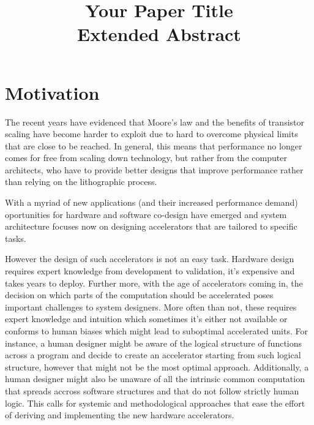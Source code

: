 \documentclass[pageno]{jpaper}
\begin{document}
\title{Your Paper Title \\ \textbf{Extended Abstract}}

\date{}

\maketitle

\thispagestyle{empty}



\section{Motivation}
\label{sec:motivation}

The recent years have evidenced that Moore's law and the benefits of transistor 
scaling have become harder to exploit due to hard to overcome physical limits
that are close to be reached. In general, this means that performance no longer comes
for free from scaling down technology, but rather from the computer
architects, who have to provide better designs that improve performance rather than 
relying on the lithographic process. 

With a myriad of new applications (and their increased performance demand) oportunities for hardware and software co-design have emerged and system architecture focuses now
on designing accelerators that are tailored to specific tasks.

However the design of such accelerators is not an easy task. Hardware design 
requires expert knowledge from development to validation, it's expensive and 
takes years to deploy. Further more, with the age of accelerators coming in,
the decision on which parts of the computation should be accelerated poses important
challenges to system designers. More often than not, these requires expert knowledge
and intuition which sometimes it's either not available or conforms to human biases 
which might lead to suboptimal accelerated units. For instance, a human designer
might be aware of the logical structure of functions across a program and decide
to create an accelerator starting from such logical structure, 
however that might not be the most optimal approach. Additionally, a human designer might also be unaware of all the intrinsic common computation that spreads accross software structures and that do not follow strictly human logic. This calls for systemic
and methodological approaches that ease the effort of deriving and implementing
the new hardware accelerators.
\end{document}
